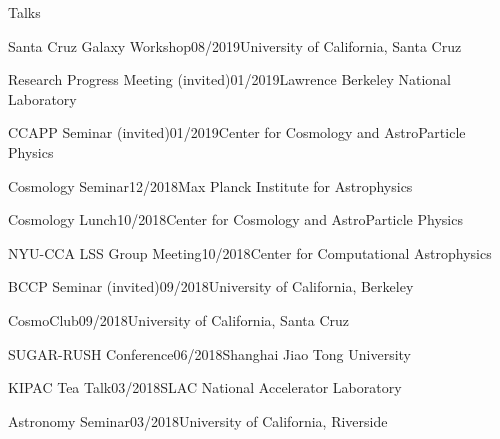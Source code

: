 \documentclass[11pt]{resume} %
\begin{document}
\begin{rSection}{Talks}
  \begin{adjustwidth}{0.5cm}{}

    \begin{rSubsection}{Santa Cruz Galaxy Workshop}{08/2019}{University of California, Santa Cruz}{}\end{rSubsection}

    \begin{rSubsection}{Research Progress Meeting (invited)}{01/2019}{Lawrence Berkeley National Laboratory}{}\end{rSubsection}

    \begin{rSubsection}{CCAPP Seminar (invited)}{01/2019}{Center for Cosmology and AstroParticle Physics}{}\end{rSubsection}

    \begin{rSubsection}{Cosmology Seminar}{12/2018}{Max Planck Institute for Astrophysics}{}\end{rSubsection}
    
    \begin{rSubsection}{Cosmology Lunch}{10/2018}{Center for Cosmology and AstroParticle Physics}{}\end{rSubsection}

    \begin{rSubsection}{NYU-CCA LSS Group Meeting}{10/2018}{Center for Computational Astrophysics}{}\end{rSubsection}

    \begin{rSubsection}{BCCP Seminar (invited)}{09/2018}{University of California, Berkeley}{}\end{rSubsection}

    \begin{rSubsection}{CosmoClub}{09/2018}{University of California, Santa Cruz}{}\end{rSubsection}

    \begin{rSubsection}{SUGAR-RUSH Conference}{06/2018}{Shanghai Jiao Tong University}{}\end{rSubsection}

    \begin{rSubsection}{KIPAC Tea Talk}{03/2018}{SLAC National Accelerator Laboratory}{}\end{rSubsection}

    \begin{rSubsection}{Astronomy Seminar}{03/2018}{University of California, Riverside}{}\end{rSubsection}


\end{adjustwidth}
\end{rSection}
\end{document}
